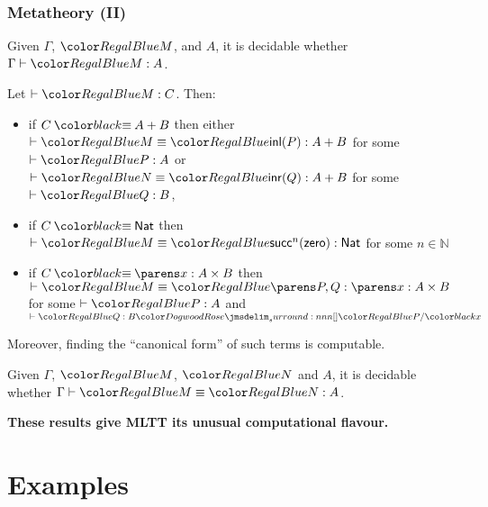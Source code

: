 \documentclass[handout]{beamer} %
\begin{document}
\begin{frame}
  \frametitle{Metatheory (II)}
  
  \begin{theorem}
    Given $\Gamma$, $\Tm{M}$, and $A$, it is decidable whether $\IsTm{M}{A}$.
  \end{theorem}
  
  \begin{theorem}[Canonicity]
    Let $\IsTm[]{M}{C}$. Then:
    \begin{itemize}
      \item if $C \deq A + B$ then either $\EqTm[]{M}{\Inl{P}}{A + B}$ for some $\IsTm[]{P}{A}$ or $\EqTm[]{N}{\Inr{Q}}{A + B}$ for some $\IsTm[]{Q}{B}$,
      \item if $C \deq \Nat$ then $\EqTm[]{M}{\textsf{succ}^n(\Zero)}{\Nat}$ for some $n \in \mathbb{N}$
      \item if $C \deq \DSum{x}{A}{B}$ then $\EqTm[]{M}{\Pair{P}{Q}}{\DSum{x}{A}{B}}$ for some $\IsTm[]{P}{A}$ and $\IsTm[]{Q}{\Sb{B}{P}{x}}$
    \end{itemize}
    Moreover, finding the ``canonical form'' of such terms is computable.
  \end{theorem}

  \begin{theorem}[Normalization]
    Given $\Gamma$, $\Tm{M}$, $\Tm{N}$ and $A$, it is decidable whether
    $\EqTm{M}{N}{A}$.
  \end{theorem}
  
  \textbf{These results give MLTT its unusual computational flavour.}
\end{frame}


\section{Examples}
\end{document}

